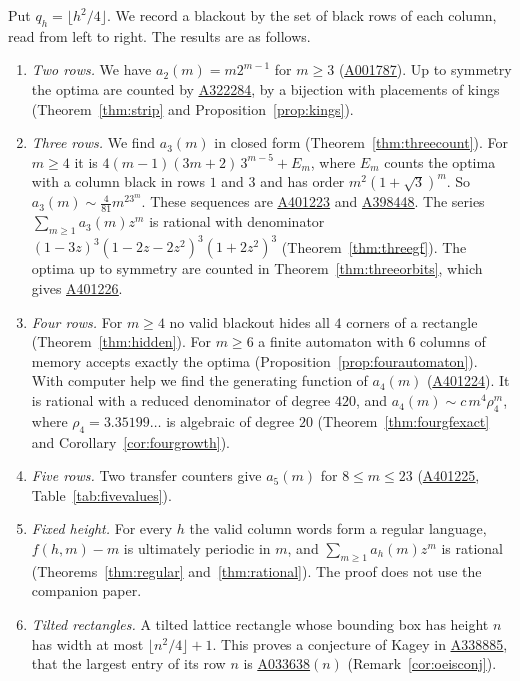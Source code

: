 \documentclass[12pt]{article}
\theoremstyle{plain}
\theoremstyle{definition}
\theoremstyle{remark}
\newcommand{\seqnum}[1]{\href{https://oeis.org/#1}{\rm \underline{#1}}}
\begin{document}
Put $q_h=\lfloor h^2/4\rfloor$. We record a blackout by the set of black rows
of each column, read from left to right. The results are as follows.

\begin{enumerate}[(1),leftmargin=*]
\item \emph{Two rows.} We have $a_2(m)=m2^{m-1}$ for $m\ge3$ (\seqnum{A001787}).
Up to symmetry the optima are counted by \seqnum{A322284}, by a bijection with
placements of kings (Theorem~\ref{thm:strip} and Proposition~\ref{prop:kings}).
\item \emph{Three rows.} We find $a_3(m)$ in closed form
(Theorem~\ref{thm:threecount}). For $m\ge4$ it is $4(m-1)(3m+2)\,3^{m-5}+E_m$,
where $E_m$ counts the optima with a column black in rows $1$ and $3$ and has
order $m^2(1+\sqrt3)^m$. So $a_3(m)\sim\frac4{81}m^23^m$. These sequences are
\seqnum{A401223} and \seqnum{A398448}. The series $\sum_{m\ge1}a_3(m)z^m$ is
rational with denominator $(1-3z)^3(1-2z-2z^2)^3(1+2z^2)^3$
(Theorem~\ref{thm:threegf}). The optima up to symmetry are counted in
Theorem~\ref{thm:threeorbits}, which gives \seqnum{A401226}.
\item \emph{Four rows.} For $m\ge4$ no valid blackout hides all $4$ corners of a
rectangle (Theorem~\ref{thm:hidden}). For $m\ge6$ a finite automaton with $6$
columns of memory accepts exactly the optima
(Proposition~\ref{prop:fourautomaton}). With computer help we find the generating function of $a_4(m)$
(\seqnum{A401224}). It is rational with a reduced denominator of degree $420$, and
$a_4(m)\sim c\,m^4\rho_4^m$, where $\rho_4=3.35199\ldots$ is algebraic of
degree $20$ (Theorem~\ref{thm:fourgfexact} and Corollary~\ref{cor:fourgrowth}).
\item \emph{Five rows.} Two transfer counters give $a_5(m)$ for $8\le m\le23$
(\seqnum{A401225}, Table~\ref{tab:fivevalues}).
\item \emph{Fixed height.} For every $h$ the valid column words form a regular
language, $f(h,m)-m$ is ultimately periodic in $m$, and $\sum_{m\ge1}a_h(m)z^m$
is rational (Theorems~\ref{thm:regular} and~\ref{thm:rational}). The proof does
not use the companion paper.
\item \emph{Tilted rectangles.} A tilted lattice rectangle whose bounding box has
height $n$ has width at most $\lfloor n^2/4\rfloor+1$. This proves a conjecture
of Kagey in \seqnum{A338885}, that the largest entry of its row $n$ is
\seqnum{A033638}$(n)$ (Remark~\ref{cor:oeisconj}).
\end{enumerate}
\end{document}
